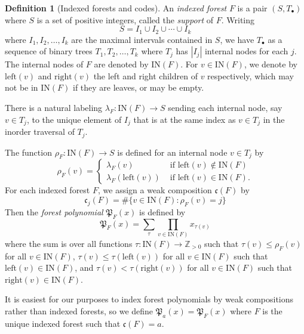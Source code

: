 \documentclass{amsart}
\theoremstyle{definition}
\newtheorem{definition}[lemma]{Definition}
\theoremstyle{remark}
\numberwithin{equation}{subsection}
\newcommand{\code}{\mathfrak{c}}
\newcommand{\forest}{\mathfrak{P}}
\begin{document}
\begin{definition}[Indexed forests and codes]
  An \emph{indexed forest} $F$ is a pair $(S, T_\bullet)$ where $S$ is a set of positive integers, called the \emph{support} of $F$. Writing
  $$S=I_1\cup I_2\cup \cdots \cup I_k$$
  where $I_1,I_2,\ldots, I_k$ are the maximal intervals contained in $S$, we have $T_\bullet$ as a sequence of binary trees $T_1,T_2,\ldots, T_k$ where $T_j$ has $|I_j|$ internal nodes for each $j$. The internal nodes of $F$ are denoted by $\mathrm{IN}(F)$. For $v\in \mathrm{IN}(F)$, we denote by $\mathrm{left}(v)$ and $\mathrm{right}(v)$ the left and right children of $v$ respectively, which may not be in $\mathrm{IN}(F)$ if they are leaves, or may be empty.
  
  There is a natural labeling $\lambda_F:\mathrm{IN}(F)\to S$ sending each internal node, say $v\in T_j$, to the unique element of $I_j$ that is at the same index as $v\in T_j$ in the inorder traversal of $T_j$.
  
  The function $\rho_F:\mathrm{IN}(F)\to S$ is defined for an internal node $v\in T_j$ by 
  $$\rho_F(v) = \begin{cases}
  \lambda_F(v)&\mbox{ if }\mathrm{left}(v)\notin\mathrm{IN}(F)\\
  \lambda_F(\mathrm{left}(v))&\mbox{ if }\mathrm{left}(v)\in\mathrm{IN}(F).
  \end{cases}$$
  For each indexed forest $F$, we assign a weak composition $\code(F)$ by
  $$\code_j(F)=\#\{v\in \mathrm{IN}(F): \rho_F(v)=j\}$$
  Then the \emph{forest polynomial} $\forest_F(x)$ is defined by
  $$\forest_F(x) = \sum_{\tau}\prod_{v\in\mathrm{IN}(F)}x_{\tau(v)}$$
  where the sum is over all functions $\tau:\mathrm{IN}(F)\to \mathbb{Z}_{>0}$ such that $\tau(v)\leq \rho_F(v)$ for all $v\in \mathrm{IN}(F)$, $\tau(v)\leq\tau(\mathrm{left}(v))$ for all $v\in \mathrm{IN}(F)$ such that $\mathrm{left}(v)\in \mathrm{IN}(F)$, and $\tau(v)<\tau(\mathrm{right}(v))$ for all $v\in \mathrm{IN}(F)$ such that $\mathrm{right}(v)\in \mathrm{IN}(F)$.

  It is easiest for our purposes to index forest polynomials by weak compositions rather than indexed forests, so we define $\forest_a(x) = \forest_F(x)$ where $F$ is the unique indexed forest such that $\code(F) = a$.
\end{definition}
\end{document}
